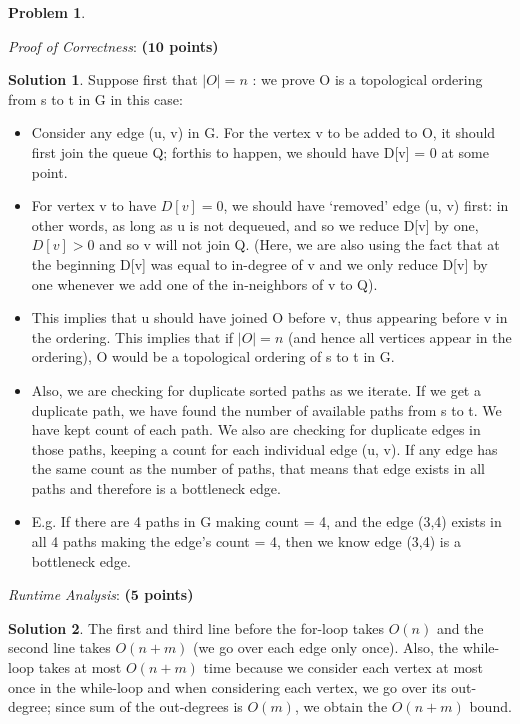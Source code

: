 \documentclass{article}
\theoremstyle{definition}
\newtheorem{problem}{Problem}
\newtheorem*{solution*}{Solution}
\newenvironment{solution}{\begin{solution*}}{{} \end{solution*}}
\newcommand{\grade}[1]{\hfill{\textbf{($\mathbf{#1}$ points)}}}
\begin{document}
\begin{problem}
\begin{enumerate}
	\newpage
	\item[(b)] \emph{Proof of Correctness}: \grade{10} 
	
	
\begin{solution}
	\item Suppose first that $|O|=n$ :  we prove O is a topological ordering from s to t in G in this case:
	\begin{itemize}
	\item Consider any edge (u, v) in G.  For the vertex v to be added to O, it should first join the queue Q; forthis to happen, we should have D[v] = 0 at some point.
	\item For vertex v to have $D[v] = 0$, we should have ‘removed’ edge (u, v) first:  in other words, as long as u is not dequeued, and so we reduce D[v] by one, $D[v]>0$ and so v will not join Q.  (Here, we are also using the fact that at the beginning D[v] was equal to in-degree of v and we only reduce D[v] by one whenever we add one of the in-neighbors of v to Q).
	\item This implies that u should have joined O before v, thus appearing before v in the ordering. This implies that if $|O|=n$ (and hence all vertices appear in the ordering), O would be a topological ordering of s to t in G.
	\item Also, we are checking for duplicate sorted paths as we iterate. If we get a duplicate path, we have found the number of available paths from s to t. We have kept count of each path. We also are checking for duplicate edges in those paths, keeping a count for each individual edge (u, v). If any edge has the same count as the number of paths, that means that edge exists in all paths and therefore is a bottleneck edge. 
	\item E.g. If there are 4 paths in G making count = 4, and the edge (3,4) exists in all 4 paths making the edge's count = 4, then we know edge (3,4) is a bottleneck edge.
	\end{itemize} 
\end{solution}

\bigskip

	\item[(c)] \emph{Runtime Analysis}: \grade{5} 
	
	
\begin{solution}
	The first and third line before the for-loop takes $O(n)$ and the second line takes $O(n+m)$ (we go over each edge only once).  Also, the while-loop takes at most $O(n+m)$ time because we consider each vertex at most once in the while-loop and when considering each vertex, we go over its out-degree; since sum of the out-degrees is $O(m)$, we obtain the $O(n+m)$ bound.
\end{solution}

\end{enumerate}
	
\end{problem} 
\end{document}
